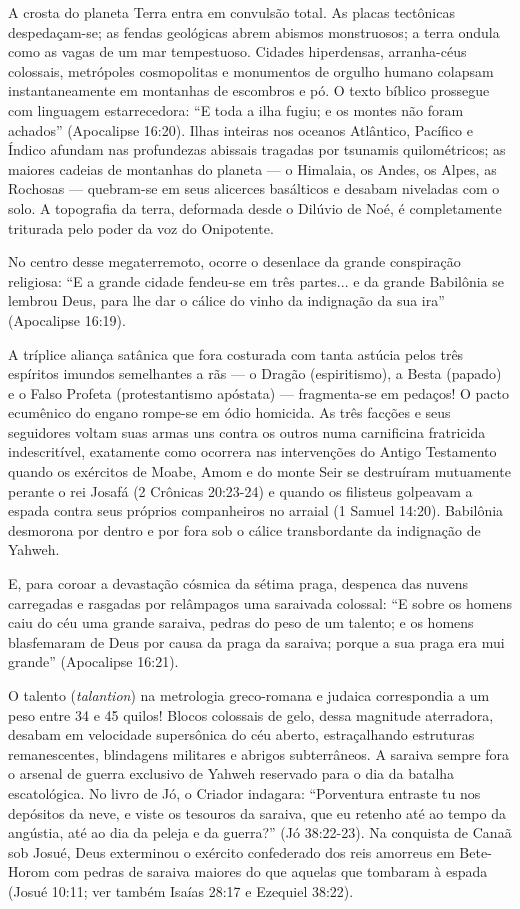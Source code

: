 A crosta do planeta Terra entra em convulsão total. As placas tectônicas despedaçam-se; as fendas geológicas abrem abismos monstruosos; a terra ondula como as vagas de um mar tempestuoso. Cidades hiperdensas, arranha-céus colossais, metrópoles cosmopolitas e monumentos de orgulho humano colapsam instantaneamente em montanhas de escombros e pó.
O texto bíblico prossegue com linguagem estarrecedora: ``E toda a ilha fugiu; e os montes não foram achados'' (Apocalipse 16:20).
Ilhas inteiras nos oceanos Atlântico, Pacífico e Índico afundam nas profundezas abissais tragadas por tsunamis quilométricos; as maiores cadeias de montanhas do planeta — o Himalaia, os Andes, os Alpes, as Rochosas — quebram-se em seus alicerces basálticos e desabam niveladas com o solo. A topografia da terra, deformada desde o Dilúvio de Noé, é completamente triturada pelo poder da voz do Onipotente.

No centro desse megaterremoto, ocorre o desenlace da grande conspiração religiosa:
``E a grande cidade fendeu-se em três partes... e da grande Babilônia se lembrou Deus, para lhe dar o cálice do vinho da indignação da sua ira'' (Apocalipse 16:19).

A tríplice aliança satânica que fora costurada com tanta astúcia pelos três espíritos imundos semelhantes a rãs — o Dragão (espiritismo), a Besta (papado) e o Falso Profeta (protestantismo apóstata) — fragmenta-se em pedaços! O pacto ecumênico do engano rompe-se em ódio homicida. As três facções e seus seguidores voltam suas armas uns contra os outros numa carnificina fratricida indescritível, exatamente como ocorrera nas intervenções do Antigo Testamento quando os exércitos de Moabe, Amom e do monte Seir se destruíram mutuamente perante o rei Josafá (2 Crônicas 20:23-24) e quando os filisteus golpeavam a espada contra seus próprios companheiros no arraial (1 Samuel 14:20). Babilônia desmorona por dentro e por fora sob o cálice transbordante da indignação de Yahweh.

E, para coroar a devastação cósmica da sétima praga, despenca das nuvens carregadas e rasgadas por relâmpagos uma saraivada colossal:
``E sobre os homens caiu do céu uma grande saraiva, pedras do peso de um talento; e os homens blasfemaram de Deus por causa da praga da saraiva; porque a sua praga era mui grande'' (Apocalipse 16:21).

O talento (\textit{talantion}) na metrologia greco-romana e judaica correspondia a um peso entre 34 e 45 quilos! Blocos colossais de gelo, dessa magnitude aterradora, desabam em velocidade supersônica do céu aberto, estraçalhando estruturas remanescentes, blindagens militares e abrigos subterrâneos.
A saraiva sempre fora o arsenal de guerra exclusivo de Yahweh reservado para o dia da batalha escatológica. No livro de Jó, o Criador indagara: ``Porventura entraste tu nos depósitos da neve, e viste os tesouros da saraiva, que eu retenho até ao tempo da angústia, até ao dia da peleja e da guerra?'' (Jó 38:22-23). Na conquista de Canaã sob Josué, Deus exterminou o exército confederado dos reis amorreus em Bete-Horom com pedras de saraiva maiores do que aquelas que tombaram à espada (Josué 10:11; ver também Isaías 28:17 e Ezequiel 38:22).

